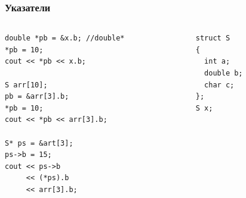 \documentclass{beamer}
\begin{document}
\begin{frame}[fragile]
\frametitle{Указатели} 


\begin{columns}[t]
  \begin{column}{0.7\textwidth}

\begin{flushleft}
\begin{lstlisting}
double *pb = &x.b; //double*
*pb = 10;
cout << *pb << x.b;

S arr[10];
pb = &arr[3].b;
*pb = 10;
cout << *pb << arr[3].b;

S* ps = &art[3];
ps->b = 15;
cout << ps->b 
     << (*ps).b 
     << arr[3].b;

\end{lstlisting}
\end{flushleft}
  \end{column}
  \begin{column}{0.3\textwidth}

\begin{flushleft}
\begin{lstlisting}
struct S 
{
  int a; 
  double b; 
  char c;
};
S x;
\end{lstlisting}
\end{flushleft}


  \end{column}
\end{columns}



\end{frame}
\end{document}
